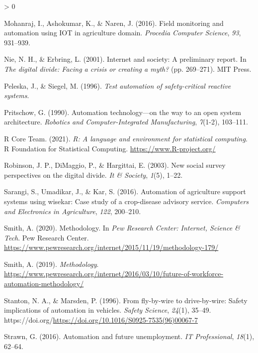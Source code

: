 \documentclass[
  english,
  man]{apa7}
\newlength{\cslhangindent}
\newenvironment{CSLReferences}[2] %
 {%
  \setlength{\parindent}{0pt}
  \ifodd #1 \everypar{\setlength{\hangindent}{\cslhangindent}}\ignorespaces\fi
  \ifnum #2 > 0
  \setlength{\parskip}{#2\baselineskip}
  \fi
 }%
 {}
\begin{document}
\begin{CSLReferences}{1}{0}
\leavevmode\hypertarget{ref-mohanraj2016field}{}%
Mohanraj, I., Ashokumar, K., \& Naren, J. (2016). Field monitoring and automation using IOT in agriculture domain. \emph{Procedia Computer Science}, \emph{93}, 931--939.

\leavevmode\hypertarget{ref-10.5555ux2f762625.762640}{}%
Nie, N. H., \& Erbring, L. (2001). Internet and society: A preliminary report. In \emph{The digital divide: Facing a crisis or creating a myth?} (pp. 269--271). MIT Press.

\leavevmode\hypertarget{ref-peleska1996test}{}%
Peleska, J., \& Siegel, M. (1996). \emph{Test automation of safety-critical reactive systems}.

\leavevmode\hypertarget{ref-pritschow1990automation}{}%
Pritschow, G. (1990). Automation technology---on the way to an open system architecture. \emph{Robotics and Computer-Integrated Manufacturing}, \emph{7}(1-2), 103--111.

\leavevmode\hypertarget{ref-R-base}{}%
R Core Team. (2021). \emph{R: A language and environment for statistical computing}. R Foundation for Statistical Computing. \url{https://www.R-project.org/}

\leavevmode\hypertarget{ref-robinson2003new}{}%
Robinson, J. P., DiMaggio, P., \& Hargittai, E. (2003). New social survey perspectives on the digital divide. \emph{It \& Society}, \emph{1}(5), 1--22.

\leavevmode\hypertarget{ref-sarangi2016automation}{}%
Sarangi, S., Umadikar, J., \& Kar, S. (2016). Automation of agriculture support systems using wisekar: Case study of a crop-disease advisory service. \emph{Computers and Electronics in Agriculture}, \emph{122}, 200--210.

\leavevmode\hypertarget{ref-smith_2020}{}%
Smith, A. (2020). Methodology. In \emph{Pew Research Center: Internet, Science \& Tech}. Pew Research Center. \url{https://www.pewresearch.org/internet/2015/11/19/methodology-179/}

\leavevmode\hypertarget{ref-smith_2019}{}%
Smith, A. (2019). \emph{Methodology}. \url{https://www.pewresearch.org/internet/2016/03/10/future-of-workforce-automation-methodology/}

\leavevmode\hypertarget{ref-STANTON199635}{}%
Stanton, N. A., \& Marsden, P. (1996). From fly-by-wire to drive-by-wire: Safety implications of automation in vehicles. \emph{Safety Science}, \emph{24}(1), 35--49. https://doi.org/\url{https://doi.org/10.1016/S0925-7535(96)00067-7}

\leavevmode\hypertarget{ref-strawn2016automation}{}%
Strawn, G. (2016). Automation and future unemployment. \emph{IT Professional}, \emph{18}(1), 62--64.


\end{CSLReferences}
\end{document}
